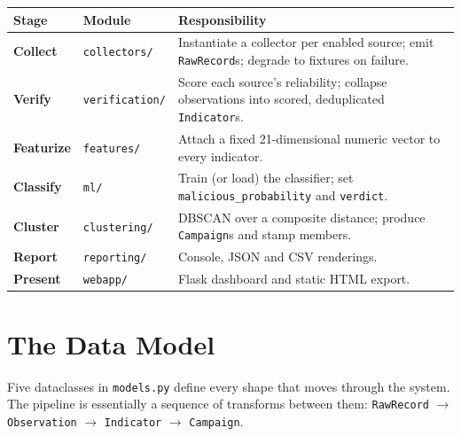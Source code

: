 \documentclass[11pt,a4paper]{article}
\newcommand{\code}[1]{\texttt{\small #1}}
\begin{document}
\begin{center}
\begin{tabularx}{\linewidth}{@{}>{\bfseries}p{2.4cm}p{2.9cm}X@{}}
\toprule
\rowcolor{paper}\textbf{Stage} & \textbf{Module} & \textbf{Responsibility} \\
\midrule
Collect & \code{collectors/} & Instantiate a collector per enabled source; emit \code{RawRecord}s; degrade to fixtures on failure. \\
Verify & \code{verification/} & Score each source's reliability; collapse observations into scored, deduplicated \code{Indicator}s. \\
Featurize & \code{features/} & Attach a fixed 21-dimensional numeric vector to every indicator. \\
Classify & \code{ml/} & Train (or load) the classifier; set \code{malicious\_probability} and \code{verdict}. \\
Cluster & \code{clustering/} & DBSCAN over a composite distance; produce \code{Campaign}s and stamp members. \\
Report & \code{reporting/} & Console, JSON and CSV renderings. \\
Present & \code{webapp/} & Flask dashboard and static HTML export. \\
\bottomrule
\end{tabularx}
\end{center}

\section{The Data Model}

Five dataclasses in \code{models.py} define every shape that moves through the
system. The pipeline is essentially a sequence of transforms between them:
\code{RawRecord} $\rightarrow$ \code{Observation} $\rightarrow$
\code{Indicator} $\rightarrow$ \code{Campaign}.
\end{document}
